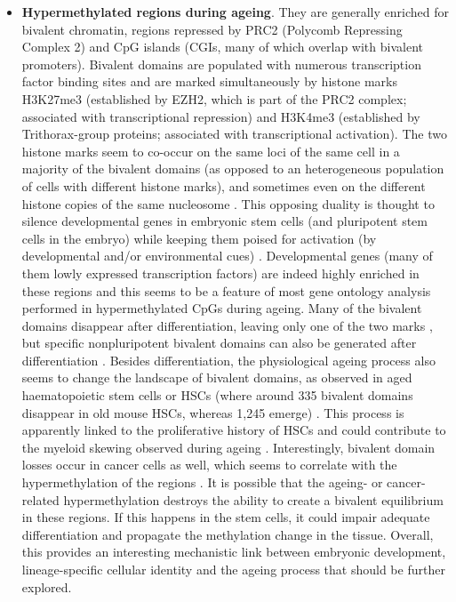 \begin{itemize}
	\item \textbf{Hypermethylated regions during ageing}. They are generally enriched for bivalent chromatin, regions repressed by \acrshort{PRC2} (Polycomb Repressing Complex 2) and CpG islands (\acrshort{CGI}s, many of which overlap with bivalent promoters). Bivalent domains are populated with numerous transcription factor binding sites and are marked simultaneously by histone marks H3K27me3 (established by EZH2, which is part of the PRC2 complex; associated with transcriptional repression) and H3K4me3 (established by Trithorax-group proteins; associated with transcriptional activation). The two histone marks seem to co-occur on the same loci of the same cell in a majority of the bivalent domains (as opposed to an heterogeneous population of cells with different histone marks), and sometimes even on the different histone copies of the same nucleosome \citep{Voigt2013}. This opposing duality is thought to silence developmental genes in embryonic stem cells (and pluripotent stem cells in the embryo) while keeping them poised for activation (by developmental and/or environmental cues) \citep{Voigt2013}. Developmental genes (many of them lowly expressed transcription factors) are indeed highly enriched in these regions and this seems to be a feature of most gene ontology analysis performed in hypermethylated CpGs during ageing. Many of the bivalent domains disappear after differentiation, leaving only one of the two marks \citep{Bernstein2006}, but specific nonpluripotent bivalent domains can also be generated after differentiation \citep{Voigt2013}. Besides differentiation, the physiological ageing process also seems to change the landscape of bivalent domains, as observed in aged haematopoietic stem cells or \acrshort{HSCs} (where around 335 bivalent domains disappear in old mouse HSCs, whereas 1,245 emerge) \citep{Sun2014x}. This process is apparently linked to the proliferative history of \acrshort{HSCs} \citep{Beerman2013} and could contribute to the myeloid skewing observed during ageing \citep{Sun2014x,Beerman2013}. Interestingly, bivalent domain losses occur in cancer cells as well, which seems to correlate with the hypermethylation of the regions \citep{Bernhart2016}. It is possible that the ageing- or cancer-related hypermethylation destroys the ability to create a bivalent equilibrium in these regions. If this happens in the stem cells, it could impair adequate differentiation and propagate the methylation change in the tissue. Overall, this provides an interesting mechanistic link between embryonic development, lineage-specific cellular identity and the ageing process that should be further explored.   
	

\end{itemize}
